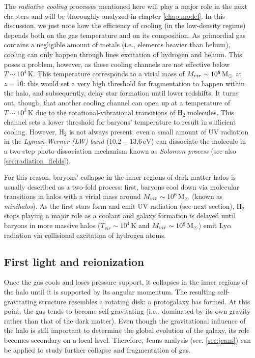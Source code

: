  The \textit{radiative cooling} processes mentioned here will play a major role in the next chapters and will be thoroughly analyzed in chapter \ref{chap:model}. In this discussion, we just note how the efficiency of cooling (in the low-density regime) depends both on the gas temperature and on its composition. As primordial gas contains a negligible amount of metals (i.e., elements heavier than helium), cooling can only happen through lines excitation of hydrogen and helium. This poses a problem, however, as these cooling channels are not effective below $T\sim10^4\,\mathrm{K}$. This temperature corresponds to a virial mass of $M_{vir}\sim 10^8\,{\rm M}_{\odot}$ at $z=10$: this would set a very high threshold for fragmentation to happen within the halo, and subsequently, delay star formation until lower redshifts. It turns out, though, that another cooling channel can open up at a temperature of $T\sim 10^3\,\mathrm{K}$ due to the rotational-vibrational transitions of $\mathrm{H}_2$ molecules. This channel sets a lower threshold for baryons' temperature to result in sufficient cooling. However, $\mathrm{H}_2$ is not always present: even a small amount of UV radiation in the \textit{Lyman-Werner (LW) band} ($10.2-13.6\,\mathrm{eV}$) can dissociate the molecule in a two-step photo-dissociation mechanism known as \textit{Solomon process} \citep{draine_bertoldi} (see also \ref{sec:radiation_fields}).
 
 For this reason, baryons' collapse in the inner regions of dark matter halos is usually described as a two-fold process: first, baryons cool down via molecular transitions in halos with a virial mass around $M_{vir}\sim10^6\,{\rm M}_{\odot}$ (known as \textit{minihalos}). As the first stars form and emit UV radiation (see next section), $\mathrm{H}_2$ stops playing a major role as a coolant and galaxy formation is delayed until baryons in more massive halos ($T_{vir}\sim10^4\,\mathrm{K}$ and $M_{vir}\sim 10^8\,{\rm M}_{\odot}$) emit $\mathrm{Ly}\alpha$ radiation via collisional excitation of hydrogen atoms.
 

 
 \subsection{First light and reionization} \label{sec:first_lights_reionization}
 
 Once the gas cools and loses pressure support, it collapses in the inner regions of the halo until it is supported by its angular momentum. The resulting self-gravitating structure resembles a rotating disk: a protogalaxy has formed. At this point, the gas tends to become self-gravitating (i.e., dominated by its own gravity rather than that of the dark matter). Even though the gravitational influence of the halo is still important to determine the global evolution of the galaxy, its role becomes secondary on a local level. Therefore, Jeans analysis (sec. \ref{sec:jeans}) can be applied to study further collapse and fragmentation of gas. 
 

